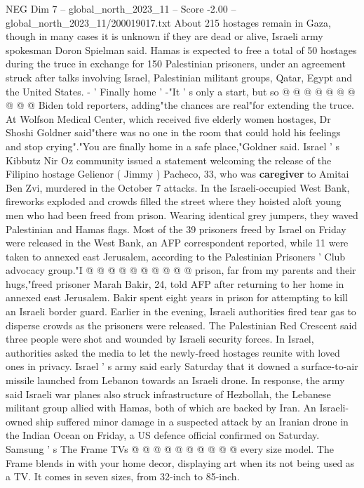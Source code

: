 \begin{textsample}{NEG Dim 7 – global\_north\_2023\_11 – Score -2.00 – global\_north\_2023\_11/200019017.txt}
About 215 hostages remain in Gaza, though in many cases it is unknown if they are dead or alive, Israeli army spokesman Doron Spielman said.
Hamas is expected to free a total of 50 hostages during the truce in exchange for 150 Palestinian prisoners, under an agreement struck after talks involving Israel, Palestinian militant groups, Qatar, Egypt and the United States. - ' Finally home ' -"It ' s only a start, but so @ @ @ @ @ @ @ @ @ @ Biden told reporters, adding"the chances are real"for extending the truce.
At Wolfson Medical Center, which received five elderly women hostages, Dr Shoshi Goldner said"there was no one in the room that could hold his feelings and stop crying"."You are finally home in a safe place,"Goldner said.
Israel ' s Kibbutz Nir Oz community issued a statement welcoming the release of the Filipino hostage Gelienor ( Jimmy ) Pacheco, 33, who was \textbf{caregiver} to Amitai Ben Zvi, murdered in the October 7 attacks.
In the Israeli-occupied West Bank, fireworks exploded and crowds filled the street where they hoisted aloft young men who had been freed from prison.
Wearing identical grey jumpers, they waved Palestinian and Hamas flags.
Most of the 39 prisoners freed by Israel on Friday were released in the West Bank, an AFP correspondent reported, while 11 were taken to annexed east Jerusalem, according to the Palestinian Prisoners ' Club advocacy group."I @ @ @ @ @ @ @ @ @ @ prison, far from my parents and their hugs,"freed prisoner Marah Bakir, 24, told AFP after returning to her home in annexed east Jerusalem.
Bakir spent eight years in prison for attempting to kill an Israeli border guard.
Earlier in the evening, Israeli authorities fired tear gas to disperse crowds as the prisoners were released.
The Palestinian Red Crescent said three people were shot and wounded by Israeli security forces.
In Israel, authorities asked the media to let the newly-freed hostages reunite with loved ones in privacy.
Israel ' s army said early Saturday that it downed a surface-to-air missile launched from Lebanon towards an Israeli drone.
In response, the army said Israeli war planes also struck infrastructure of Hezbollah, the Lebanese militant group allied with Hamas, both of which are backed by Iran.
An Israeli-owned ship suffered minor damage in a suspected attack by an Iranian drone in the Indian Ocean on Friday, a US defence official confirmed on Saturday.
Samsung ' s The Frame TVs @ @ @ @ @ @ @ @ @ @ every size model.
The Frame blends in with your home decor, displaying art when its not being used as a TV.
It comes in seven sizes, from 32-inch to 85-inch.

\end{textsample}
